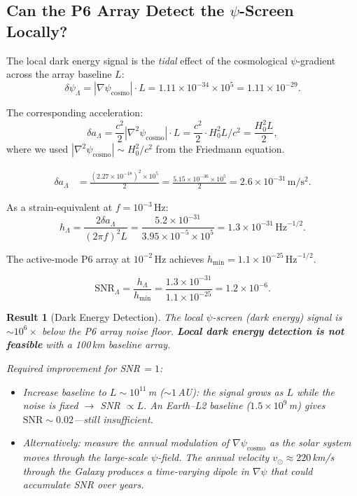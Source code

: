 \documentclass[11pt]{article}
\newtheorem{result}[theorem]{Result}
\theoremstyle{definition}
\theoremstyle{remark}
\begin{document}
\subsection{Can the P6 Array Detect the $\psi$-Screen Locally?}

The local dark energy signal is the \emph{tidal} effect of the
cosmological $\psi$-gradient across the array baseline $L$:
\begin{equation}
\delta\psi_\Lambda = |\nabla\psi_{\mathrm{cosmo}}| \cdot L
= 1.11 \times 10^{-34} \times 10^5
= 1.11 \times 10^{-29}.
\end{equation}

The corresponding acceleration:
\begin{equation}
\delta a_\Lambda = \frac{c^2}{2} |\nabla^2\psi_{\mathrm{cosmo}}| \cdot L
= \frac{c^2}{2} \cdot H_0^2 L / c^2 = \frac{H_0^2 L}{2},
\end{equation}
where we used $|\nabla^2\psi_{\mathrm{cosmo}}| \sim H_0^2/c^2$ from
the Friedmann equation.

\begin{align}
\delta a_\Lambda &= \frac{(2.27 \times 10^{-18})^2 \times 10^5}{2}
= \frac{5.15 \times 10^{-36} \times 10^5}{2}
= 2.6 \times 10^{-31}\,\mathrm{m/s^2}.
\end{align}

As a strain-equivalent at $f = 10^{-3}$\,Hz:
\begin{equation}
h_\Lambda = \frac{2\delta a_\Lambda}{(2\pi f)^2 L}
= \frac{5.2 \times 10^{-31}}{3.95 \times 10^{-5} \times 10^5}
= 1.3 \times 10^{-31}\,\mathrm{Hz}^{-1/2}.
\end{equation}

The active-mode P6 array at $10^{-2}$\,Hz achieves
$h_{\min} = 1.1 \times 10^{-25}\,\mathrm{Hz}^{-1/2}$.

\begin{equation}
\mathrm{SNR}_\Lambda = \frac{h_\Lambda}{h_{\min}}
= \frac{1.3 \times 10^{-31}}{1.1 \times 10^{-25}} = 1.2 \times 10^{-6}.
\end{equation}

\begin{result}[Dark Energy Detection]\label{res:dark-energy}
The local $\psi$-screen (dark energy) signal is $\sim 10^6\times$ below
the P6 array noise floor. \textbf{Local dark energy detection is not
feasible} with a 100\,km baseline array.

Required improvement for SNR\,$= 1$:
\begin{itemize}
\item Increase baseline to $L \sim 10^{11}$\,m ($\sim 1$\,AU): the
signal grows as $L$ while the noise is fixed $\to$ SNR $\propto L$.
An Earth--L2 baseline ($1.5 \times 10^9$\,m) gives
$\mathrm{SNR} \sim 0.02$---still insufficient.
\item Alternatively: measure the annual modulation of $\nabla\psi_{\mathrm{cosmo}}$
as the solar system moves through the large-scale $\psi$-field.
The annual velocity $v_\odot \approx 220$\,km/s through the Galaxy
produces a time-varying dipole in $\nabla\psi$ that could accumulate
SNR over years.
\end{itemize}
\end{result}
\end{document}
